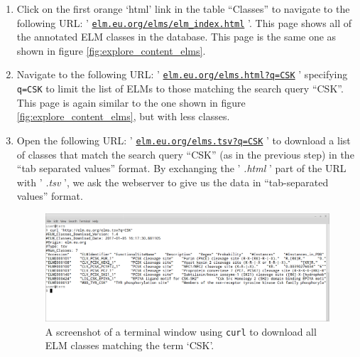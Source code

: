 \documentclass[12pt]{article}
\newcommand\rurl[1]{%
	\href{http://#1}{\nolinkurl{#1}}%
}
\newcommand\fileformat[1]{%
    \textit{#1}{}%
}%
\newcommand\code[1]{%
    \texttt{#1}{}%
}%
\begin{document}
\begin{enumerate}
\item Click on the first orange `html' link in the table ``Classes'' to
	navigate to the following URL:
	'\rurl{elm.eu.org/elms/elm\_index.html}'. This page shows all of the
	annotated ELM classes in the database. This page is the same one as
	shown in figure \ref{fig:explore_content_elms}.

\item Navigate to the following URL: '\rurl{elm.eu.org/elms.html?q=CSK}'
	specifying \code{q=CSK} to limit the list of ELMs to those matching the
	search query ``CSK''. This page is again similar to the one shown in
	figure \ref{fig:explore_content_elms}, but with less classes.



\item Open the following URL: '\rurl{elm.eu.org/elms.tsv?q=CSK}' to download a
	list of classes that match the search query ``CSK'' (as in the previous
	step) in the ``tab separated values'' format. By exchanging the
	'\fileformat{.html}' part of the URL with '\fileformat{.tsv}', we ask the
	webserver to give us the data in ``tab-separated values'' format.


\begin{figure}[h!]
	\centering
	\includegraphics[width=\textwidth]{Figures/search_REST/elm_curl_classes_CSK.png}
	\caption{
	A screenshot of a terminal window using
	\code{curl} to download all ELM classes matching the term `CSK'.
	}
	\label{fig:search_REST_curl_csk}
\end{figure}


\end{enumerate}
\end{document}

